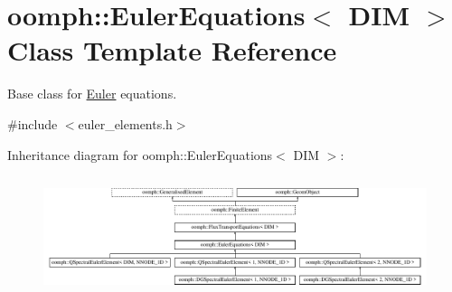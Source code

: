 \hypertarget{classoomph_1_1EulerEquations}{}\section{oomph\+:\+:Euler\+Equations$<$ D\+IM $>$ Class Template Reference}
\label{classoomph_1_1EulerEquations}


Base class for \hyperlink{classoomph_1_1Euler}{Euler} equations.  




{\ttfamily \#include $<$euler\+\_\+elements.\+h$>$}

Inheritance diagram for oomph\+:\+:Euler\+Equations$<$ D\+IM $>$\+:\begin{figure}[H]
\begin{center}
\leavevmode
\includegraphics[height=3.522013cm]{classoomph_1_1EulerEquations}
\end{center}
\end{figure}
